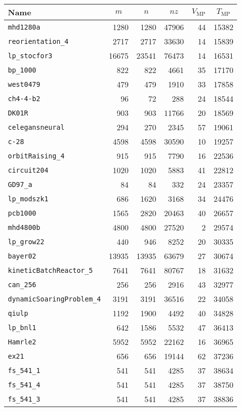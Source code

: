 \begin{table}[p]
\begin{center}
\begin{tabular}{lrrrrr}
\hline
Name&\multicolumn{1}{c}{$m$}&
\multicolumn{1}{c}{$n$}&
\multicolumn{1}{c}{$nz$}&
\multicolumn{1}{c}{$V_{\mathrm{MP}}$}&
\multicolumn{1}{c}{$T_{\mathrm{MP}}$}\\
\hline
\hline
\texttt{mhd1280a}&1280&1280&47906&44&15382\\
\texttt{reorientation\_4}&2717&2717&33630&14&15839\\
\texttt{lp\_stocfor3}&16675&23541&76473&14&16531\\
\texttt{bp\_1000}&822&822&4661&35&17170\\
\texttt{west0479}&479&479&1910&33&17858\\
\texttt{ch4-4-b2}&96&72&288&24&18544\\
\texttt{DK01R}&903&903&11766&20&18569\\
\texttt{celegansneural}&294&270&2345&57&19061\\
\texttt{c-28}&4598&4598&30590&10&19257\\
\texttt{orbitRaising\_4}&915&915&7790&16&22536\\
\texttt{circuit204}&1020&1020&5883&41&22812\\
\texttt{GD97\_a}&84&84&332&24&23357\\
\texttt{lp\_modszk1}&686&1620&3168&34&24476\\
\texttt{pcb1000}&1565&2820&20463&40&26657\\
\texttt{mhd4800b}&4800&4800&27520&2&29574\\
\texttt{lp\_grow22}&440&946&8252&20&30335\\
\texttt{bayer02}&13935&13935&63679&27&30674\\
\texttt{kineticBatchReactor\_5}&7641&7641&80767&18&31632\\
\texttt{can\_256}&256&256&2916&43&32977\\
\texttt{dynamicSoaringProblem\_4}&3191&3191&36516&22&34058\\
\texttt{qiulp}&1192&1900&4492&40&34828\\
\texttt{lp\_bnl1}&642&1586&5532&47&36413\\
\texttt{Hamrle2}&5952&5952&22162&16&36965\\
\texttt{ex21}&656&656&19144&62&37236\\
\texttt{fs\_541\_1}&541&541&4285&37&38634\\
\texttt{fs\_541\_4}&541&541&4285&37&38750\\
\texttt{fs\_541\_3}&541&541&4285&37&38836\\

\end{tabular}
\end{center}
\end{table}
